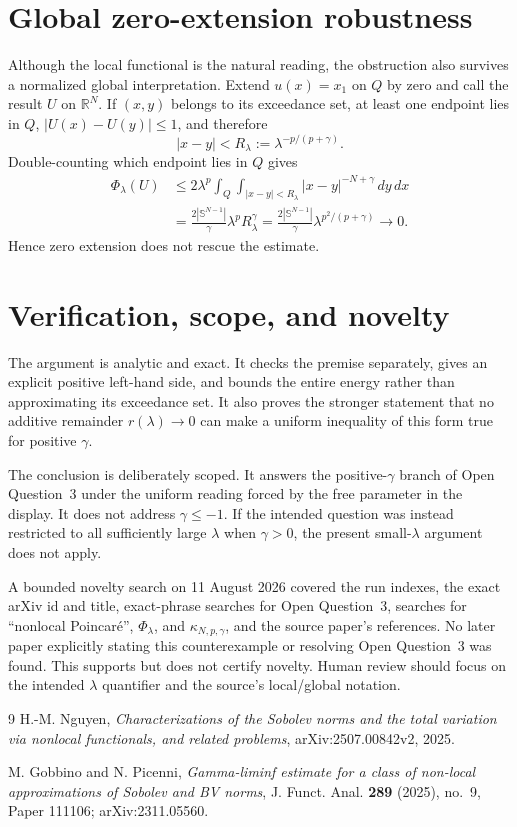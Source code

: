 \documentclass[11pt]{article}
\newcommand{\R}{\mathbb{R}}
\newcommand{\Sph}{\mathbb{S}}
\begin{document}
\section{Global zero-extension robustness}

Although the local functional is the natural reading, the obstruction also
survives a normalized global interpretation.  Extend $u(x)=x_1$ on $Q$ by
zero and call the result $U$ on $\R^N$.  If $(x,y)$ belongs to its exceedance
set, at least one endpoint lies in $Q$, $|U(x)-U(y)|\le1$, and therefore
\[
 |x-y|<R_\lambda:=\lambda^{-p/(p+\gamma)}.
\]
Double-counting which endpoint lies in $Q$ gives
\begin{align*}
 \Phi_\lambda(U)
 &\le2\lambda^p\int_Q\int_{|x-y|<R_\lambda}
 |x-y|^{-N+\gamma}\,dy\,dx\\
 &=\frac{2|\Sph^{N-1}|}{\gamma}
 \lambda^pR_\lambda^\gamma
 =\frac{2|\Sph^{N-1}|}{\gamma}
 \lambda^{p^2/(p+\gamma)}\longrightarrow0.
\end{align*}
Hence zero extension does not rescue the estimate.

\section{Verification, scope, and novelty}

The argument is analytic and exact.  It checks the premise separately, gives
an explicit positive left-hand side, and bounds the entire energy rather than
approximating its exceedance set.  It also proves the stronger statement that
no additive remainder $r(\lambda)\to0$ can make a uniform inequality of this
form true for positive $\gamma$.

The conclusion is deliberately scoped.  It answers the positive-$\gamma$
branch of Open Question~3 under the uniform reading forced by the free
parameter in the display.  It does not address $\gamma\le-1$.  If the intended
question was instead restricted to all sufficiently large $\lambda$ when
$\gamma>0$, the present small-$\lambda$ argument does not apply.

A bounded novelty search on 11 August 2026 covered the run indexes, the exact
arXiv id and title, exact-phrase searches for Open Question~3, searches for
``nonlocal Poincar\'e'', $\Phi_\lambda$, and $\kappa_{N,p,\gamma}$, and the
source paper's references.  No later paper explicitly stating this
counterexample or resolving Open Question~3 was found.  This supports but
does not certify novelty.  Human review should focus on the intended
$\lambda$ quantifier and the source's local/global notation.

\begin{thebibliography}{9}
H.-M. Nguyen,
\emph{Characterizations of the Sobolev norms and the total variation via
nonlocal functionals, and related problems},
arXiv:2507.00842v2, 2025.

M. Gobbino and N. Picenni,
\emph{Gamma-liminf estimate for a class of non-local approximations of Sobolev
and BV norms},
J. Funct. Anal. \textbf{289} (2025), no.~9, Paper 111106;
arXiv:2311.05560.
\end{thebibliography}
\end{document}
